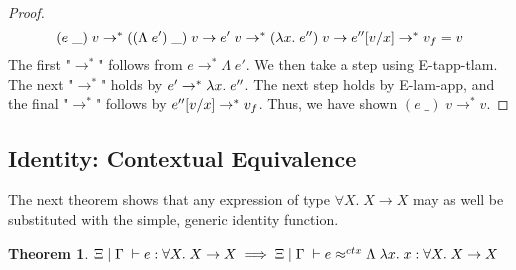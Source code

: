 \documentclass[a4paper, 11pt]{report}
\newtheorem{theorem}{Theorem}
\theoremstyle{definition}
\newcommand{\var}{x}
\newcommand{\expr}{e}
\newcommand{\val}{v}
\newcommand{\Tvar}{X}
\newcommand{\Tlam}{\Lambda\;}
\newcommand{\Tapp}[1]{#1\;\_}
\newcommand{\subst}[3]{#1{\left[#3 \middle/ #2 \right]}}
\newcommand{\Tfunc}[2]{#1 \rightarrow #2}
\newcommand{\Tall}[2]{\forall #1.\; #2}
\newcommand{\venv}{\Gamma}
\newcommand{\tenv}{\Xi}
\newcommand{\jdg}[4]{#1 \; | \; #2 \; \vdash #3 : #4}
\newcommand{\jdgRel}[6]{#1 \; | \; #2 \; \vdash #3 \approx^{#4} #5 : #6}
\newcommand{\ctxRel}[5]{\jdgRel{#1}{#2}{#3}{ctx}{#4}{#5}}
\newcommand{\step}{\rightarrow}
\newcommand{\stepS}{\rightarrow^*}
\begin{document}
\begin{proof}
  \begin{equation}
    (\Tapp{\expr}) \; \val \stepS (\Tapp{(\Tlam \expr')}) \; \val \step \expr' \; \val \stepS (\fun \var . \expr'') \; \val \step \subst{\expr''}{\var}{\val} \stepS \val_f = \val
  \end{equation}
  The first "$\stepS$" follows from $\expr \stepS \Tlam \expr'$. We then take a step using E-tapp-tlam. The next "$\stepS$" holds by $\expr' \stepS \fun \var . \expr''$. The next step holds by E-lam-app, and the final "$\stepS$" follows by $\subst{\expr''}{\var}{\val} \stepS \val_f$. Thus, we have shown $(\Tapp{\expr}) \; \val \stepS \val$.
\end{proof}

\subsection{Identity: Contextual Equivalence}
The next theorem shows that any expression of type $\Tall{\Tvar}{\Tfunc{\Tvar}{\Tvar}}$ may as well be substituted with the simple, generic identity function.
\begin{theorem}
  $\jdg{\tenv}{\venv}{\expr}{\Tall{\Tvar}{\Tfunc{\Tvar}{\Tvar}}} \implies \ctxRel{\tenv}{\venv}{\expr}{\Tlam \fun \var . \var}{\Tall{\Tvar}{\Tfunc{\Tvar}{\Tvar}}}$
\end{theorem}
\end{document}
